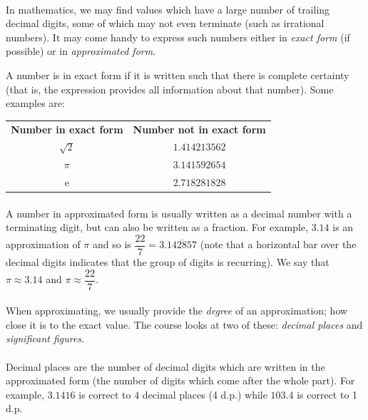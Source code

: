\documentclass[12pt, a4paper, titlepage, twoside]{article}
\newcommand*{\e}{\textrm{e}}
\begin{document}
	\paragraph{}
	In mathematics, we may find values which have a large number of trailing decimal digits, some of which may not even terminate
	(such as irrational numbers). It may come handy to express such numbers either in \textit{exact form} (if possible) or in 
	\textit{approximated form}.\\
	
	\begin{kp}
		A number is in exact form if it is written such that there is complete certainty (that is, the expression provides all information
		about that number). Some examples are:
		
		\begin{longtable}{|c|c|}
			\hline
			\textbf{Number in exact form} & \textbf{Number not in exact form}\\
			\hhline{|=|=|}
			$\sqrt{2}$ & $1.414213562$\\
			\hline
			$\pi$ & $3.141592654$\\
			\hline
			$\e$ & $2.718281828$\\
			\hline
		\end{longtable}
	\end{kp}
	
	\paragraph{}
	A number in approximated form is usually written as a decimal number with a terminating digit, but can also be written as a fraction.
	For example, $3.14$ is an approximation of $\pi$ and so is $\dfrac{22}{7} = 3.\overline{142857}$ (note that a horizontal bar over the
	decimal digits indicates that the group of digits is recurring). We say that $\pi \approx 3.14$ and $\pi \approx \dfrac{22}{7}$.
	
	\paragraph{}
	When approximating, we usually provide the \textit{degree} of an approximation; how close it is to the exact value. The course looks 
	at two of these: \textit{decimal places} and \textit{significant figures}.
	
	\paragraph{}
	Decimal places are the number of decimal digits which are written in the approximated form (the number of digits which come after
	the whole part). For example, $3.1416$ is correct to $4$ decimal places (4 d.p.) while $103.4$ is correct to 1 d.p.
	
\end{document}
